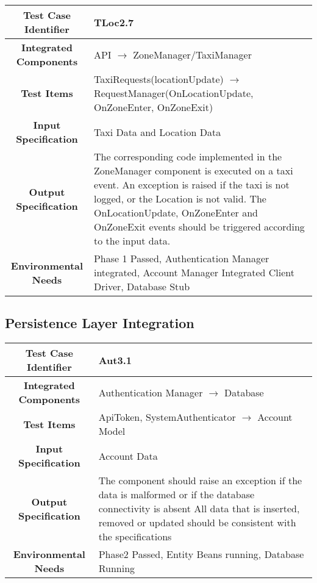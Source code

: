 \documentclass[11pt, a4paper,titlepage]{article}
\begin{document}
	 \begin{tabularx}{\textwidth}{| c|X|}
	 	\hline \textbf{Test Case Identifier} & \label{TLoc2.7}TLoc2.7\\
	 	\hline \textbf{Integrated Components} & API  $\rightarrow $  ZoneManager/TaxiManager \\
	 	\hline \textbf{Test Items} & TaxiRequests(locationUpdate) $\rightarrow $ RequestManager(OnLocationUpdate, OnZoneEnter, OnZoneExit) \\
	 	\hline \textbf{Input Specification} & Taxi Data and Location Data \\
	 	\hline \textbf{Output Specification} & The corresponding code implemented in the ZoneManager component is executed on a taxi event. 
	 	\newline An exception is raised if the taxi is not logged, or the Location is not valid. \newline
	 	The OnLocationUpdate, OnZoneEnter and OnZoneExit events should be triggered according to the input data. \\
	 	\hline \textbf{Environmental Needs} &  Phase 1 Passed, Authentication Manager integrated, Account Manager Integrated \newline 
	 	Client Driver, Database Stub\\
	 	\hline
	 \end{tabularx}
	 \newline
	 	
	\subsection{Persistence Layer Integration}
	
		\begin{tabularx}{\textwidth}{| c|X|}
			\hline \textbf{Test Case Identifier} & \label{Aut3.1}Aut3.1 \\
			\hline \textbf{Integrated Components} & Authentication Manager $\rightarrow $ Database \\
			\hline \textbf{Test Items} & ApiToken, SystemAuthenticator $\rightarrow $ Account Model \\
			\hline \textbf{Input Specification} & Account Data \\
			\hline \textbf{Output Specification} & The component should raise an exception if the data is malformed or if the database connectivity is absent \newline
			All data that is inserted, removed or updated should be consistent with the specifications\\
			\hline \textbf{Environmental Needs} & Phase2 Passed, Entity Beans running, Database Running \\
			\hline
		\end{tabularx}
		\newline
	
\end{document}
